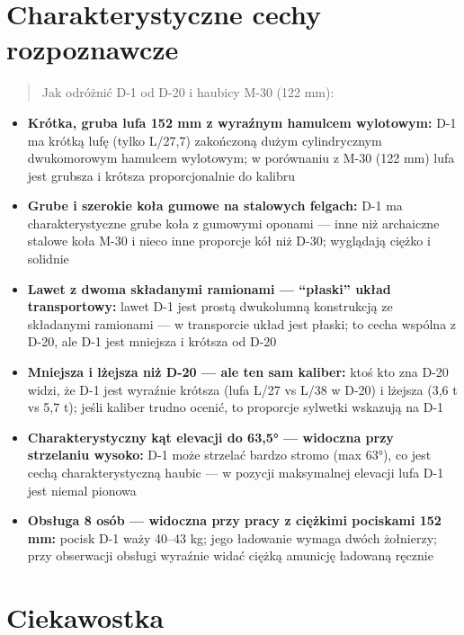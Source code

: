 \documentclass[12pt,openany,oneside]{book}
\providecommand{\tightlist}{%
  \setlength{\itemsep}{0pt}\setlength{\parskip}{0pt}}
\begin{document}
\section{Charakterystyczne cechy
rozpoznawcze}\label{charakterystyczne-cechy-rozpoznawcze-19}

\begin{quote}
Jak odróżnić D-1 od D-20 i haubicy M-30 (122 mm):
\end{quote}

\begin{itemize}
\tightlist
\item
  \textbf{Krótka, gruba lufa 152 mm z wyraźnym hamulcem wylotowym:} D-1
  ma krótką lufę (tylko L/27,7) zakończoną dużym cylindrycznym
  dwukomorowym hamulcem wylotowym; w porównaniu z M-30 (122 mm) lufa
  jest grubsza i krótsza proporcjonalnie do kalibru
\item
  \textbf{Grube i szerokie koła gumowe na stalowych felgach:} D-1 ma
  charakterystyczne grube koła z gumowymi oponami --- inne niż
  archaiczne stalowe koła M-30 i nieco inne proporcje kół niż D-30;
  wyglądają ciężko i solidnie
\item
  \textbf{Lawet z dwoma składanymi ramionami --- ``płaski'' układ
  transportowy:} lawet D-1 jest prostą dwukolumną konstrukcją ze
  składanymi ramionami --- w transporcie układ jest płaski; to cecha
  wspólna z D-20, ale D-1 jest mniejsza i krótsza od D-20
\item
  \textbf{Mniejsza i lżejsza niż D-20 --- ale ten sam kaliber:} ktoś kto
  zna D-20 widzi, że D-1 jest wyraźnie krótsza (lufa L/27 vs L/38 w
  D-20) i lżejsza (3,6 t vs 5,7 t); jeśli kaliber trudno ocenić, to
  proporcje sylwetki wskazują na D-1
\item
  \textbf{Charakterystyczny kąt elevacji do 63,5° --- widoczna przy
  strzelaniu wysoko:} D-1 może strzelać bardzo stromo (max 63°), co jest
  cechą charakterystyczną haubic --- w pozycji maksymalnej elevacji lufa
  D-1 jest niemal pionowa
\item
  \textbf{Obsługa 8 osób --- widoczna przy pracy z ciężkimi pociskami
  152 mm:} pocisk D-1 waży 40--43 kg; jego ładowanie wymaga dwóch
  żołnierzy; przy obserwacji obsługi wyraźnie widać ciężką amunicję
  ładowaną ręcznie
\end{itemize}

\section{Ciekawostka}\label{ciekawostka-19}
\end{document}
